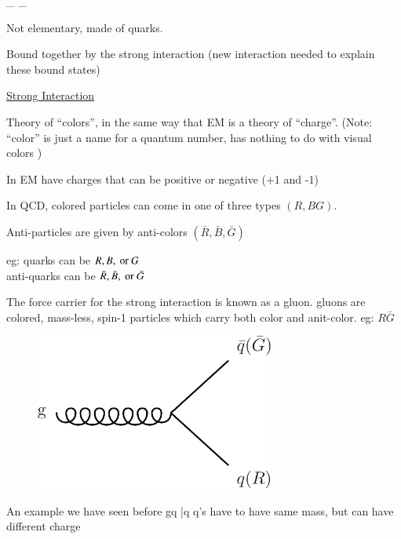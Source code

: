 {\be
{}_{} \hspace*{1in} _{} 
\ee

Not elementary, made of quarks. 

Bound together by the strong interaction (new interaction needed to explain these bound states) 

\underline{Strong Interaction} 

Theory of ``colors'', in the same way that EM is a theory of ``charge''. 
(Note: ``color'' is just a name for a quantum number, has nothing to do with visual colors ) 

In EM have charges that can be positive or negative (+1 and -1) 

In QCD, colored particles can come in one of three types $(R, B G)$. 

Anti-particles are given by anti-colors $(\bar{R}, \bar{B}, \bar{G})$ 

\begin{center}
eg: quarks can be $R, B, \textrm{ or } G$ \\
anti-quarks can be $\bar{R}, \bar{B}, \textrm{ or } \bar{G}$
\end{center}

The force carrier for the strong interaction is known as a gluon. 
gluons are colored, mass-less, spin-1 particles which carry both color and anit-color. eg: $R\bar{G}$

\hspace*{1in}

\begin{minipage}{0.4\textwidth}
\begin{figure}[H]
\centering
\includegraphics[width=0.7\textwidth]{./gluonVertex.pdf} 
\end{figure}
\end{minipage} \hfill
\begin{minipage}{0.45\textwidth}
An example we have seen before
\be
g\rightarrow q \bar{q}
\ee
q's have to have same mass, but can have different charge
\end{minipage}

}
